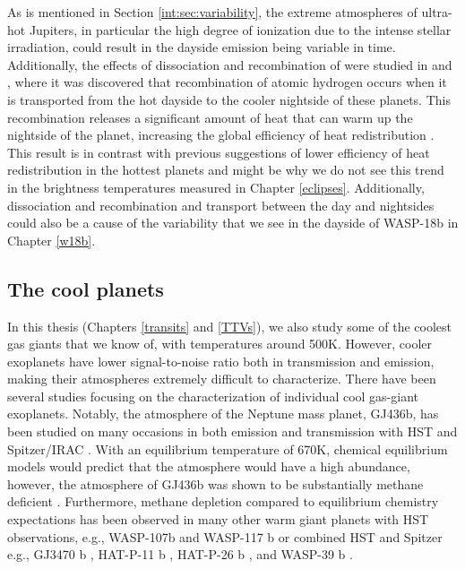 As is mentioned in Section \ref{int:sec:variability}, the extreme atmospheres of ultra-hot Jupiters, in particular the high degree of ionization due to the intense stellar irradiation, could result in the dayside emission being variable in time. Additionally, the effects of dissociation and recombination of  were studied in \citet{Komacek2018b} and \citet{Bell2018}, where it was discovered that recombination of atomic hydrogen occurs when it is transported from the hot dayside to the cooler nightside of these planets. This recombination releases a significant amount of heat that can warm up the nightside of the planet, increasing the global efficiency of heat redistribution \citep{Mansfield2020}. This result is in contrast with previous suggestions of lower efficiency of heat redistribution in the hottest planets and might be why we do not see this trend in the brightness temperatures measured in Chapter \ref{eclipses}. Additionally, dissociation and recombination and transport between the day and nightsides could also be a cause of the variability that we see in the dayside of WASP-18b in Chapter \ref{w18b}.

\subsection{The cool planets}

In this thesis (Chapters \ref{transits} and \ref{TTVs}), we also study some of the coolest gas giants that we know of, with temperatures around 500K. However, cooler exoplanets have lower signal-to-noise ratio both in transmission and emission, making their atmospheres extremely difficult to characterize. There have been several studies focusing on the characterization of individual cool gas-giant exoplanets. Notably, the atmosphere of the Neptune mass planet, GJ436b, has been studied on many occasions in both emission and transmission with HST and Spitzer/IRAC \citep{Deming2007, Demory2007, Gillon2007a, Gillon2007b, Stevenson2010a, Beaulieu2011, Knutson2011, Lanotte2014, Knutson2014a, Morley2017}. With an equilibrium temperature of 670K, chemical equilibrium models would predict that the atmosphere would have a high  abundance, however, the atmosphere of GJ436b was shown to be substantially methane deficient \citep{Stevenson2010a, Knutson2011, Lanotte2014}. Furthermore, methane depletion compared to equilibrium chemistry expectations has been observed in many other warm giant planets with HST observations, e.g., WASP-107b and WASP-117 b \citep{Kreidberg2018a, Spake2018} or combined HST and Spitzer e.g., GJ3470 b \citep{Benneke2019}, HAT-P-11 b \citep{Chachan2019}, HAT-P-26 b \citep{Wakeford2017}, and WASP-39 b \citep{Wakeford2018}.

